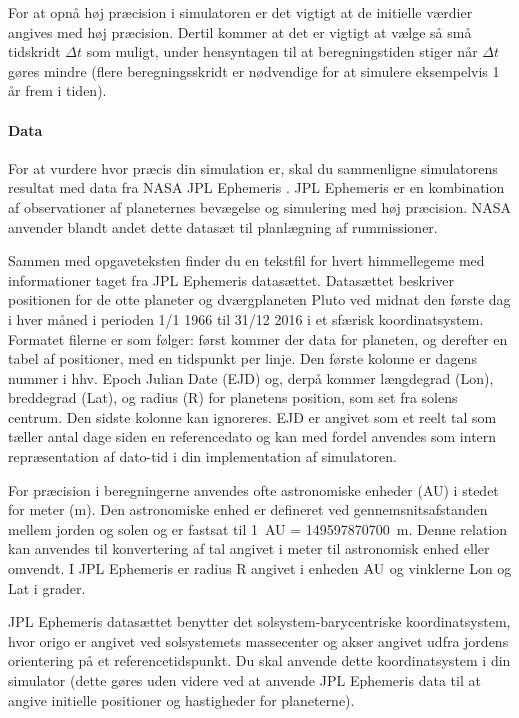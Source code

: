 \documentclass{article}
\begin{document}
\begin{enumerate}[label=11g.\arabic*,start=0]
For at opnå høj præcision i simulatoren er det vigtigt at de initielle værdier angives med høj præcision. Dertil kommer at det er vigtigt at vælge så små tidskridt $\Delta t$ som muligt, under hensyntagen til at beregningstiden stiger når $\Delta t$ gøres mindre (flere beregningsskridt er nødvendige for at simulere eksempelvis 1 år frem i tiden).

\paragraph{Data}
For at vurdere hvor præcis din simulation er, skal du sammenligne simulatorens resultat med data fra NASA JPL Ephemeris \cite{JPL}. JPL Ephemeris er en kombination af observationer af planeternes bevægelse og simulering med høj præcision. NASA anvender blandt andet dette datasæt til planlægning af rummissioner.

Sammen med opgaveteksten finder du en tekstfil for hvert himmellegeme med informationer taget fra JPL Ephemeris datasættet. Datasættet beskriver positionen for de otte planeter og dværgplaneten Pluto ved midnat den første dag i hver måned i perioden 1/1 1966 til 31/12 2016 i et sfærisk koordinatsystem. Formatet filerne er som følger: først kommer der data for planeten, og derefter en tabel af positioner, med en tidspunkt per linje. Den første kolonne er dagens nummer i hhv. Epoch Julian Date (EJD) og, derpå kommer længdegrad (Lon), breddegrad (Lat), og radius (R) for planetens position, som set fra solens centrum. Den sidste kolonne kan ignoreres.
EJD er angivet som et reelt tal som tæller antal dage siden en referencedato og kan med fordel anvendes som intern repræsentation af dato-tid i din implementation af simulatoren.

For præcision i beregningerne anvendes ofte astronomiske enheder (AU) i stedet for meter (m). Den astronomiske enhed er defineret ved gennemsnitsafstanden mellem jorden og solen og er fastsat til 1~AU = 149597870700~m. Denne relation kan anvendes til konvertering af tal angivet i meter til astronomisk enhed eller omvendt. I JPL Ephemeris er radius R angivet i enheden $\mathrm{AU}$ og vinklerne Lon og Lat i grader.

JPL Ephemeris datasættet benytter det solsystem-barycentriske koordinatsystem, hvor origo er angivet ved solsystemets massecenter og akser angivet udfra jordens orientering på et referencetidspunkt. Du skal anvende dette koordinatsystem i din simulator (dette gøres uden videre ved at anvende JPL Ephemeris data til at angive initielle positioner og hastigheder for planeterne).


\end{enumerate}
\end{document}
